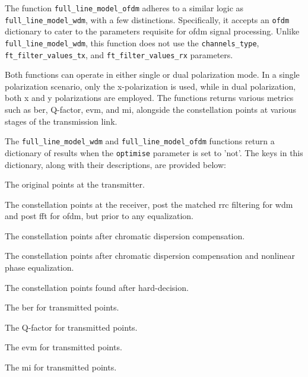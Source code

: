 The function \texttt{full\_line\_model\_ofdm} adheres to a similar logic as \texttt{full\_line\_model\_wdm}, with a few distinctions. Specifically, it accepts an \texttt{ofdm} dictionary to cater to the parameters requisite for \Gls{ofdm} signal processing. Unlike \texttt{full\_line\_model\_wdm}, this function does not use the \texttt{channels\_type}, \texttt{ft\_filter\_values\_tx}, and \texttt{ft\_filter\_values\_rx} parameters.


Both functions can operate in either single or dual polarization mode. In a single polarization scenario, only the x-polarization is used, while in dual polarization, both x and y polarizations are employed. The functions returns various metrics such as \acrfull{ber}, Q-factor, \acrfull{evm}, and \acrfull{mi}, alongside the constellation points at various stages of the transmission link.

The \texttt{full\_line\_model\_wdm} and \texttt{full\_line\_model\_ofdm} functions return a dictionary of results when the \texttt{optimise} parameter is set to 'not'. The keys in this dictionary, along with their descriptions, are provided below:

\begin{description}[style=multiline, leftmargin=4cm, font=\normalfont]
    \item[\texttt{points\_orig}] The original points at the transmitter.
    \item[\texttt{points\_noneq}] The constellation points at the receiver, post the matched \acrshort{rrc} filtering for \acrshort{wdm} and post \acrshort{fft} for \acrshort{ofdm}, but prior to any equalization.
    \item[\texttt{points}] The constellation points after chromatic dispersion compensation.
    \item[\texttt{points\_shifted}] The constellation points after chromatic dispersion compensation and nonlinear phase equalization.
    \item[\texttt{points\_found}] The constellation points found after hard-decision.
    \item[\texttt{ber}] The \acrshort{ber} for transmitted points.
    \item[\texttt{q}] The Q-factor for transmitted points.
    \item[\texttt{evm}] The \acrshort{evm} for transmitted points.
    \item[\texttt{mi}] The \acrshort{mi} for transmitted points.
\end{description}

